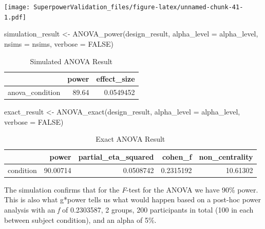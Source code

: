 \documentclass[
]{book}
\newenvironment{Shaded}{\begin{snugshade}}{\end{snugshade}}
\newcommand{\AttributeTok}[1]{\textcolor[rgb]{0.77,0.63,0.00}{#1}}
\newcommand{\ConstantTok}[1]{\textcolor[rgb]{0.00,0.00,0.00}{#1}}
\newcommand{\FunctionTok}[1]{\textcolor[rgb]{0.00,0.00,0.00}{#1}}
\newcommand{\NormalTok}[1]{#1}
\newcommand{\OtherTok}[1]{\textcolor[rgb]{0.56,0.35,0.01}{#1}}
\begin{document}
\texttt{[image: SuperpowerValidation\_files/figure-latex/unnamed-chunk-41-1.pdf]}

\begin{Shaded}
\begin{Highlighting}[]
\NormalTok{simulation\_result }\OtherTok{\textless{}{-}} \FunctionTok{ANOVA\_power}\NormalTok{(design\_result,}
                                 \AttributeTok{alpha\_level =}\NormalTok{ alpha\_level,}
                                 \AttributeTok{nsims =}\NormalTok{ nsims,}
                                 \AttributeTok{verbose =} \ConstantTok{FALSE}\NormalTok{)}
\end{Highlighting}
\end{Shaded}

\begin{table}[!h]

\caption{\label{tab:unnamed-chunk-43}Simulated ANOVA Result}
\centering
\begin{tabular}[t]{l|r|r}
\hline
  & power & effect\_size\\
\hline
anova\_condition & 89.64 & 0.0549452\\
\hline
\end{tabular}
\end{table}

\begin{Shaded}
\begin{Highlighting}[]
\NormalTok{exact\_result }\OtherTok{\textless{}{-}} \FunctionTok{ANOVA\_exact}\NormalTok{(design\_result,}
                            \AttributeTok{alpha\_level =}\NormalTok{ alpha\_level,}
                            \AttributeTok{verbose =} \ConstantTok{FALSE}\NormalTok{)}
\end{Highlighting}
\end{Shaded}

\begin{table}[!h]

\caption{\label{tab:unnamed-chunk-45}Exact ANOVA Result}
\centering
\begin{tabular}[t]{l|r|r|r|r}
\hline
  & power & partial\_eta\_squared & cohen\_f & non\_centrality\\
\hline
condition & 90.00714 & 0.0508742 & 0.2315192 & 10.61302\\
\hline
\end{tabular}
\end{table}

The simulation confirms that for the \emph{F}-test for the ANOVA we have 90\% power. This is also what g*power tells us what would happen based on a post-hoc power analysis with an \emph{f} of 0.2303587, 2 groups, 200 participants in total (100 in each between subject condition), and an alpha of 5\%.
\end{document}
